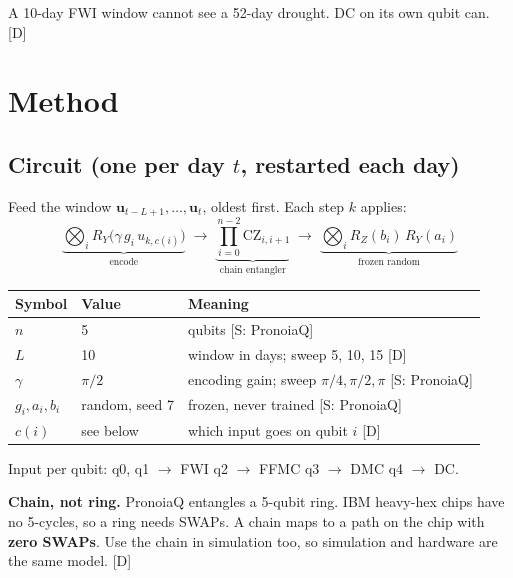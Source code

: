 \documentclass[11pt,a4paper]{article}
\newcommand{\tagbox}[2]{{\footnotesize\color{#1}\textsf{[#2]}}}
\newcommand{\supp}[1]{\tagbox{ForestGreen!70!black}{S: #1}}  %
\newcommand{\ours}{\tagbox{NavyBlue}{D}}                      %
\begin{document}
A 10-day FWI window cannot see a 52-day drought. DC on its own qubit can. \ours

\section{Method}

\subsection{Circuit (one per day $t$, restarted each day)}
Feed the window $\mathbf u_{t-L+1},\dots,\mathbf u_t$, oldest first. Each step $k$ applies:
\[
\underbrace{\bigotimes_i R_Y\!\big(\gamma\, g_i\, u_{k,c(i)}\big)}_{\text{encode}}
\;\longrightarrow\;
\underbrace{\prod_{i=0}^{n-2} \mathrm{CZ}_{i,i+1}}_{\text{chain entangler}}
\;\longrightarrow\;
\underbrace{\bigotimes_i R_Z(b_i)\,R_Y(a_i)}_{\text{frozen random}}
\]

\begin{center}\small
\begin{tabularx}{\linewidth}{@{}l l Y@{}}
\toprule
\textbf{Symbol} & \textbf{Value} & \textbf{Meaning}\\
\midrule
$n$ & 5 & qubits \supp{PronoiaQ}\\
$L$ & 10 & window in days; sweep 5, 10, 15 \ours\\
$\gamma$ & $\pi/2$ & encoding gain; sweep $\pi/4,\pi/2,\pi$ \supp{PronoiaQ}\\
$g_i,a_i,b_i$ & random, seed 7 & frozen, never trained \supp{PronoiaQ}\\
$c(i)$ & see below & which input goes on qubit $i$ \ours\\
\bottomrule
\end{tabularx}
\end{center}

Input per qubit: \quad q0, q1 $\to$ FWI \quad q2 $\to$ FFMC \quad q3 $\to$ DMC \quad q4 $\to$ DC.

\begin{decision}
\textbf{Chain, not ring.} PronoiaQ entangles a 5-qubit ring. IBM heavy-hex chips have no 5-cycles, so a ring
needs SWAPs. A chain maps to a path on the chip with \textbf{zero SWAPs}. Use the chain in simulation too, so
simulation and hardware are the same model. \ours
\end{decision}
\end{document}
